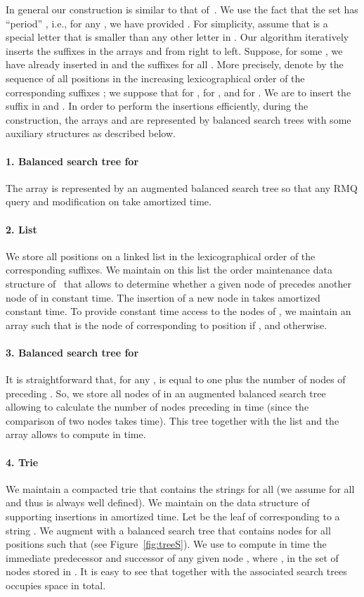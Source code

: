 \documentclass[3p,twocolumn]{elsarticle}
\theoremstyle{plain}
\theoremstyle{definition}
\begin{document}
In general our construction is similar to that of~\cite{KosolobovLempelZiv}. We use the fact that the set  has ``period'' , i.e., for any , we have  provided . For simplicity, assume that  is a special letter that is smaller than any other letter in . Our algorithm iteratively inserts the suffixes  in the arrays  and  from right to left. Suppose, for some , we have already inserted in  and  the suffixes  for all . More precisely, denote by  the sequence of all positions  in the increasing lexicographical order of the corresponding suffixes ; we suppose that  for ,  for , and  for . We are to insert the suffix  in  and . In order to perform the insertions efficiently, during the construction, the arrays  and  are represented by balanced search trees with some auxiliary structures as described below.

\paragraph{1. Balanced search tree for } The  array is represented by an augmented balanced search tree so that any RMQ query and modification on  take  amortized time.

\paragraph{2. List } We store all positions  on a linked list  in the lexicographical order of the corresponding suffixes. We maintain on this list the order maintenance data structure of~\cite{BenderColeDemaineFarachColtonZito} that allows to determine whether a given node of  precedes another node of  in constant time. The insertion of a new node in  takes amortized constant time. To provide constant time access to the nodes of , we maintain an array  such that  is the node of  corresponding to position  if , and  otherwise.

\paragraph{3. Balanced search tree for } It is straightforward that, for any ,  is equal to one plus the number of nodes of  preceding . So, we store all nodes of  in an augmented balanced search tree allowing to calculate the number of nodes preceding  in  time (since the comparison of two nodes takes  time). This tree together with the list  and the array  allows to compute  in  time.

\paragraph{4. Trie } We maintain a compacted trie  that contains the strings  for all  (we assume  for all  and thus  is always well defined). We maintain on  the data structure of~\cite{FranceschiniGrossi} supporting insertions in  amortized time. Let  be the leaf of  corresponding to a string . We augment  with a balanced search tree  that contains nodes  for all positions  such that  (see Figure~\ref{fig:treeS}). We use  to compute in  time the immediate predecessor and successor of any given node , where , in the set of nodes stored in . It is easy to see that  together with the associated search trees occupies  space in total.
\end{document}
